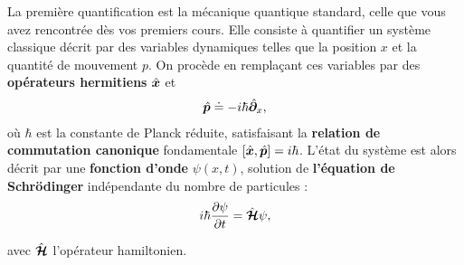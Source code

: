 La première quantification est la mécanique quantique standard, celle que vous avez rencontrée dès vos premiers cours. Elle consiste à quantifier un système classique décrit par des variables dynamiques telles que la position $x$ et la quantité de mouvement $p$. On procède en remplaçant ces variables par des {\bf opérateurs hermitiens} $\hat{\bm{x}}$ et %
\begin{eqnarray}
	\hat{\bm{p}} \doteq -i\hbar \hat{\bm{\partial}}_x,	\label{chap.1.rapel.1}
\end{eqnarray}
où $\hbar$ est la constante de Planck réduite, satisfaisant la {\bf relation de commutation canonique} fondamentale $[\hat{\bm{x}}, \hat{\bm{p}}] = i\hbar$. L’état du système est alors décrit par une {\bf fonction d’onde} $\psi(x,t)$, solution de {\bf l’équation de  Schrödinger} indépendante du nombre de particules :
\begin{eqnarray}
\quad i \hbar \frac{\partial \psi }{\partial t}  &= \hat{\bm{\mathcal{H}}} \psi,\label{chap.1.rapel.2}
\end{eqnarray}

avec $\hat{\bm{\mathcal{H}}}$ l’opérateur hamiltonien. 

